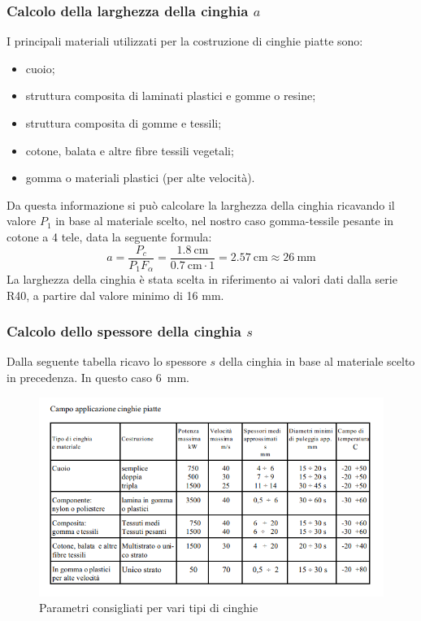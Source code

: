 \documentclass{report}
\begin{document}
\subsubsection{Calcolo della larghezza della cinghia $a$}
I principali materiali utilizzati per la costruzione di cinghie piatte sono:
\begin{itemize}
\item cuoio;
\item struttura composita di laminati plastici e gomme o resine;
\item struttura composita di gomme e tessili;
\item cotone, balata e altre fibre tessili vegetali;
\item gomma o materiali plastici (per alte velocità).
\end{itemize}
Da questa informazione si può calcolare la larghezza della cinghia ricavando il valore $P_1$ in base al materiale scelto, nel nostro caso gomma-tessile pesante in cotone a 4 tele, data la seguente formula:
\begin{equation}
  a = \frac{P_c}{P_1F_\alpha}=\frac{\SI{1,8}{\cm}}{\SI{0,7}{\cm}\cdot 1} = \SI{2,57}{\cm}\approx\SI{26}{\mm}
\end{equation}
La larghezza della cinghia è stata scelta in riferimento ai valori dati dalla serie R40, a partire dal valore minimo di 16 mm.

\subsubsection{Calcolo dello spessore della cinghia $s$}
Dalla seguente tabella ricavo lo spessore $s$ della cinghia in base al materiale scelto in precedenza. In questo caso \SI{6}{\mm}.
\begin{figure}[H] %
    \centering
    \includegraphics[width=1\textwidth]{src/img/tabella_cinghie.png}
    \caption{Parametri consigliati per vari tipi di cinghie}
    \label{fig:cinghie}
\end{figure}
\end{document}
